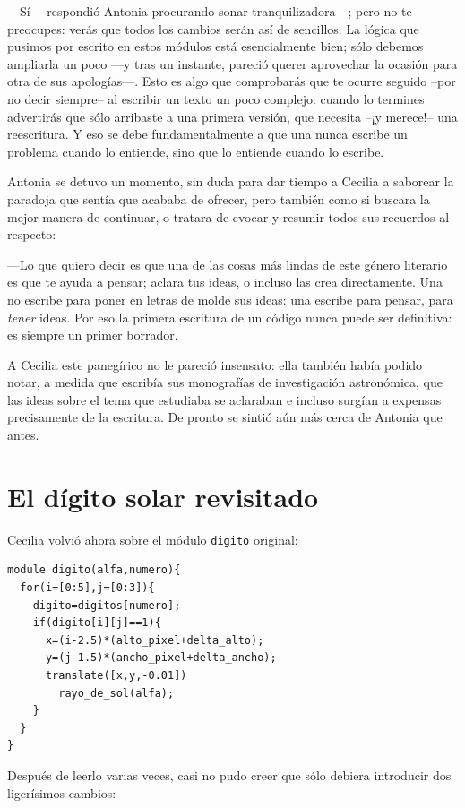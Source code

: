 ---Sí ---respondió Antonia procurando sonar
tran\-qui\-li\-za\-do\-ra---; pero no te preocupes: verás que todos
los cambios serán así de sencillos. La lógica que pusimos por escrito
en estos módulos está esencialmente bien; sólo debemos ampliarla un
poco ---y tras un instante, pareció querer aprovechar la ocasión para
otra de sus apologías---. Esto es algo que comprobarás que te ocurre
seguido --por no decir siem\-pre-- al escribir un texto un poco
complejo: cuando lo termines advertirás que sólo arribaste a una
primera versión, que necesita --¡y me\-re\-ce!-- una reescritura. Y
eso se debe fundamentalmente a que una nunca escribe un problema
cuando lo entiende, sino que lo entiende cuando lo escribe.

Antonia se detuvo un momento, sin duda para dar tiempo a Cecilia a
saborear la paradoja que sentía que acababa de ofrecer, pero también
como si buscara la mejor manera de continuar, o tratara de evocar y
resumir todos sus recuerdos al respecto:

---Lo que quiero decir es que una de las cosas más lindas de este
género literario es que te ayuda a pensar; aclara tus ideas, o incluso
las crea directamente. Una no escribe para poner en letras de molde
sus ideas: una escribe para pensar, para \emph{tener} ideas. Por eso
la primera escritura de un código nunca puede ser definitiva: es
siempre un primer borrador.

A Cecilia este panegírico no le pareció insensato: ella también había
podido notar, a medida que escribía sus monografías de investigación
astronómica, que las ideas sobre el tema que estudiaba se aclaraban e
incluso surgían a expensas precisamente de la escritura. De pronto se
sintió aún más cerca de Antonia que antes.


\section{El dígito solar revisitado}

Cecilia volvió ahora sobre el módulo \lstinline!digito! original:

\begin{lstlisting}
module digito(alfa,numero){
  for(i=[0:5],j=[0:3]){
    digito=digitos[numero];
    if(digito[i][j]==1){
      x=(i-2.5)*(alto_pixel+delta_alto);
      y=(j-1.5)*(ancho_pixel+delta_ancho);
      translate([x,y,-0.01])
        rayo_de_sol(alfa);
    }
  }
}
\end{lstlisting}

Después de leerlo varias veces, casi no pudo creer que sólo debiera
introducir dos ligerísimos cambios:

